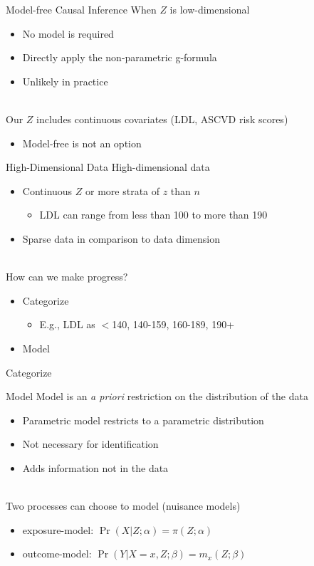 \documentclass{beamer}
\begin{document}
\begin{frame}{Model-free Causal Inference}
	When $Z$ is low-dimensional
	\begin{itemize}
		\item No model is required
		\item Directly apply the non-parametric g-formula
		\item Unlikely in practice
	\end{itemize}~\\
	Our $Z$ includes continuous covariates (LDL, ASCVD risk scores)
	\begin{itemize}
		\item Model-free is not an option
	\end{itemize}
\end{frame}

\begin{frame}{High-Dimensional Data}
	High-dimensional data 
	\begin{itemize}
		\item Continuous $Z$ or more strata of $z$ than $n$
		\begin{itemize}
			\item LDL can range from less than 100 to more than 190
		\end{itemize}
		\item Sparse data in comparison to data dimension
	\end{itemize}~\\
	How can we make progress?
	\begin{itemize}
		\item Categorize
		\begin{itemize}
			\item E.g., LDL as $<$140, 140-159, 160-189, 190+
		\end{itemize}
		\item Model
	\end{itemize}
\end{frame}

\begin{frame}{Categorize}
	\centering
\end{frame}


\begin{frame}{Model}
	Model is an \textit{a priori} restriction on the distribution of the data
	\begin{itemize}
		\item Parametric model restricts to a parametric distribution
		\item Not necessary for identification
		\item Adds information not in the data
	\end{itemize}~\\
	Two processes can choose to model (nuisance models)
	\begin{itemize}
		\item exposure-model: $\Pr(X|Z;\alpha) = \pi(Z;\alpha)$
		\item outcome-model: $\Pr(Y|X=x,Z;\beta) = m_x(Z;\beta)$
	\end{itemize}
\end{frame}
\end{document}
